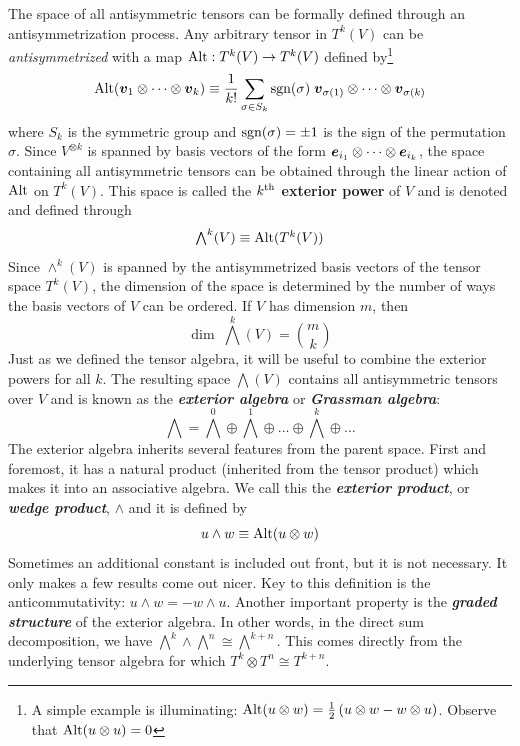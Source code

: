 \documentclass[onecolumn]{gwclass}
\begin{document}
	The space of all antisymmetric tensors can be formally defined through an antisymmetrization process. Any arbitrary tensor in $T^k(V)$ can be \emph{antisymmetrized} with a map $\text{\normalfont{Alt}}:T^k(V)\to T^k(V)$ defined by\footnote{A simple example is illuminating: $\text{\normalfont{Alt}}(u\otimes w)= \frac{1}{2}\left( u\otimes w - w\otimes u \right)$. Observe that $\text{\normalfont{Alt}}(u\otimes u)=0$}
	$$ \text{\normalfont{Alt}}(\boldsymbol{v}_1\otimes \dots \otimes \boldsymbol{v}_k) \equiv \frac{1}{k!}\sum_{\sigma\in S_k}\text{\normalfont{sgn}}(\sigma)\; \boldsymbol{v}_{\sigma(1)}\otimes\dots\otimes \boldsymbol{v}_{\sigma(k)} $$
	where $S_k$ is the symmetric group and $\text{\normalfont{sgn}}(\sigma)=\pm 1$ is the sign of the permutation $\sigma$. Since $V^{\otimes k}$ is spanned by basis vectors of the form $\boldsymbol{e}_{i_1}\otimes \dots\otimes \boldsymbol{e}_{i_k}$, the space containing all antisymmetric tensors can be obtained through the linear action of $\text{\normalfont{Alt}}$ on $T^k(V)$. This space is called the \textbf{$k^{\text{\normalfont{th}}}$ exterior power} of $V$ and is denoted and defined through
	$$ \textstyle{\bigwedge}^k(V) \equiv \text{\normalfont{Alt}}(T^k(V)) $$
	Since $\wedge^k(V)$ is spanned by the antisymmetrized basis vectors of the tensor space $T^k(V)$, the dimension of the space is determined by the number of ways the basis vectors of $V$ can be ordered. If $V$ has dimension $m$, then 
	$$ \dim \;\textstyle{\bigwedge}^k(V) = \displaystyle{m\choose k} $$
	Just as we defined the tensor algebra, it will be useful to combine the exterior powers for all $k$. The resulting space $\bigwedge(V)$ contains all antisymmetric tensors over $V$ and is known as the \textbf{\emph{exterior algebra}} or \textbf{\emph{Grassman algebra}}:
	$$ \textstyle{\bigwedge} = \textstyle{\bigwedge}^0 \oplus \textstyle{\bigwedge}^1 \oplus\dots \oplus\textstyle{\bigwedge}^k \oplus \dots $$
	The exterior algebra inherits several features from the parent space. First and foremost, it has a natural product (inherited from the tensor product) which makes it into an associative algebra. We call this the \textbf{\emph{exterior product}}, or \textbf{\emph{wedge product}}, $\wedge$ and it is defined by
	$$ u\wedge w \equiv \text{\normalfont{Alt}}(u\otimes w) $$
	Sometimes an additional constant is included out front, but it is not necessary. It only makes a few results come out nicer. Key to this definition is the anticommutativity: $u\wedge w = - w\wedge u$. Another important property is the \textbf{\emph{graded structure}} of the exterior algebra. In other words, in the direct sum decomposition, we have $\bigwedge^{k}\wedge \bigwedge^n \cong \bigwedge^{k+n}$. This comes directly from the underlying tensor algebra for which $T^k\otimes T^n \cong T^{k+n}$.
	
\end{document}
